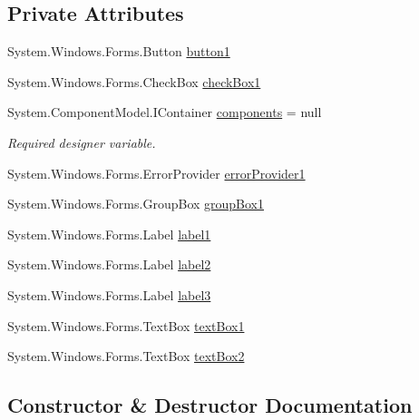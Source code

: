 \subsection*{Private Attributes}
\begin{DoxyCompactItemize}
\item 
System.\+Windows.\+Forms.\+Button \hyperlink{class__7___doroshenko__forms2__is52_1_1_task__9_a1ce96f9ed31422c523cccfacfb901d71}{button1}
\item 
System.\+Windows.\+Forms.\+Check\+Box \hyperlink{class__7___doroshenko__forms2__is52_1_1_task__9_a737be2251cf4471d667e8d37a524e87e}{check\+Box1}
\item 
System.\+Component\+Model.\+I\+Container \hyperlink{class__7___doroshenko__forms2__is52_1_1_task__9_ac9755a017e5d3a40f36e5257b2f40c3d}{components} = null
\begin{DoxyCompactList}\small\item\em Required designer variable. \end{DoxyCompactList}\item 
System.\+Windows.\+Forms.\+Error\+Provider \hyperlink{class__7___doroshenko__forms2__is52_1_1_task__9_abedcec18ac3b9ea24c6bc86c2e7b8ef8}{error\+Provider1}
\item 
System.\+Windows.\+Forms.\+Group\+Box \hyperlink{class__7___doroshenko__forms2__is52_1_1_task__9_a415778b651719828d807b6c416d03e1e}{group\+Box1}
\item 
System.\+Windows.\+Forms.\+Label \hyperlink{class__7___doroshenko__forms2__is52_1_1_task__9_ac86d6940044cbda145844b43ff3b4b4b}{label1}
\item 
System.\+Windows.\+Forms.\+Label \hyperlink{class__7___doroshenko__forms2__is52_1_1_task__9_af75573d7a79aabbea1f5ee67a8d2d055}{label2}
\item 
System.\+Windows.\+Forms.\+Label \hyperlink{class__7___doroshenko__forms2__is52_1_1_task__9_a62688341f4c20dc3167f4d0202781a77}{label3}
\item 
System.\+Windows.\+Forms.\+Text\+Box \hyperlink{class__7___doroshenko__forms2__is52_1_1_task__9_a4aa140b1ba89e675c011f4be366e21ca}{text\+Box1}
\item 
System.\+Windows.\+Forms.\+Text\+Box \hyperlink{class__7___doroshenko__forms2__is52_1_1_task__9_aca272bd2f655d99aaf77424638d7cf79}{text\+Box2}
\end{DoxyCompactItemize}


\subsection{Constructor \& Destructor Documentation}
\hypertarget{class__7___doroshenko__forms2__is52_1_1_task__9_a678e24f395e1a9fbf761bca24eaf39cf}{}\label{class__7___doroshenko__forms2__is52_1_1_task__9_a678e24f395e1a9fbf761bca24eaf39cf} 
